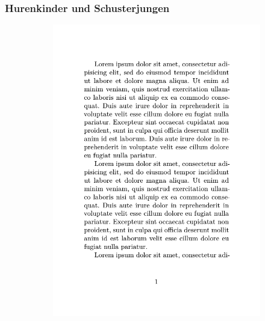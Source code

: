 \documentclass{beamer}
\begin{document}
\begin{frame}[fragile]
    \frametitle{Hurenkinder und Schusterjungen}
    \begin{figure}
        \centering%
        \begin{subfigure}{.35\textwidth}
            \includegraphics[page=1,width=\linewidth]{images/hurenkind/hurenkind.pdf}
        \end{subfigure}%
        \begin{subfigure}{.35\textwidth}

\end{subfigure}
\end{figure}
\end{frame}
\end{document}

